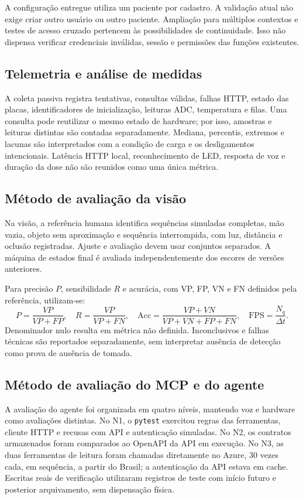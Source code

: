A configuração entregue utiliza um paciente por cadastro. A validação atual não exige criar outro usuário ou outro paciente. Ampliação para múltiplos contextos e testes de acesso cruzado pertencem às possibilidades de continuidade. Isso não dispensa verificar credenciais inválidas, sessão e permissões das funções existentes.

\subsection{Telemetria e análise de medidas}
A coleta passiva registra tentativas, consultas válidas, falhas HTTP, estado das placas, identificadores de inicialização, leituras ADC, temperatura e filas. Uma consulta pode reutilizar o mesmo estado de hardware; por isso, amostras e leituras distintas são contadas separadamente. Mediana, percentis, extremos e lacunas são interpretados com a condição de carga e os desligamentos intencionais. Latência HTTP local, reconhecimento de LED, resposta de voz e duração da dose não são reunidos como uma única métrica.

\subsection{Método de avaliação da visão}
Na visão, a referência humana identifica sequências simuladas completas, mão vazia, objeto sem aproximação e sequência interrompida, com luz, distância e oclusão registradas. Ajuste e avaliação devem usar conjuntos separados. A máquina de estados final é avaliada independentemente dos escores de versões anteriores.

Para precisão $P$, sensibilidade $R$ e acurácia, com VP, FP, VN e FN definidos pela referência, utilizam-se:
\begin{equation}\label{eq:vis-metricas}
P=\frac{VP}{VP+FP},\quad R=\frac{VP}{VP+FN},\quad
\mathrm{Acc}=\frac{VP+VN}{VP+VN+FP+FN},\quad
\mathrm{FPS}=\frac{N_q}{\Delta t}.
\end{equation}
Denominador nulo resulta em métrica não definida. Inconclusivos e falhas técnicas são reportados separadamente, sem interpretar ausência de detecção como prova de ausência de tomada.

\subsection{Método de avaliação do MCP e do agente}\label{sec:metodo-agente}
A avaliação do agente foi organizada em quatro níveis, mantendo voz e hardware como avaliações distintas. No N1, o \texttt{pytest} exercitou regras das ferramentas, cliente HTTP e recusas com API e autenticação simuladas. No N2, os contratos armazenados foram comparados ao OpenAPI da API em execução. No N3, as duas ferramentas de leitura foram chamadas diretamente no Azure, 30 vezes cada, em sequência, a partir do Brasil; a autenticação da API estava em cache. Escritas reais de verificação utilizaram registros de teste com início futuro e posterior arquivamento, sem dispensação física.

